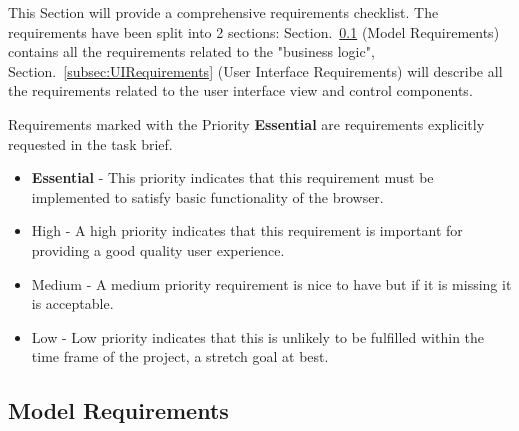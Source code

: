 \documentclass[../Main.tex]{subfiles}
\begin{document}
This Section will provide a comprehensive requirements checklist. 
The requirements have been split into 2 sections: Section.~\ref{subsec:ModelRequirements} (Model Requirements) contains all the requirements related to the "business logic", Section.~\ref{subsec:UIRequirements} (User Interface Requirements) will describe all the requirements related to the user interface view and control components.

Requirements marked with the Priority \textbf{Essential} are requirements explicitly requested in the task brief.\\
\linebreak
{}

\begin{itemize}
    \item \textbf{Essential} - This priority indicates that this requirement must be implemented to satisfy basic functionality of the browser.
    \item High - A high priority indicates that this requirement is important for providing a good quality user experience.
    \item Medium - A medium priority requirement is nice to have but if it is missing it is acceptable.
    \item Low - Low priority indicates that this is unlikely to be fulfilled within the time frame of the project, a stretch goal at best.
\end{itemize}

\subsection{Model Requirements}\label{subsec:ModelRequirements}
\end{document}
